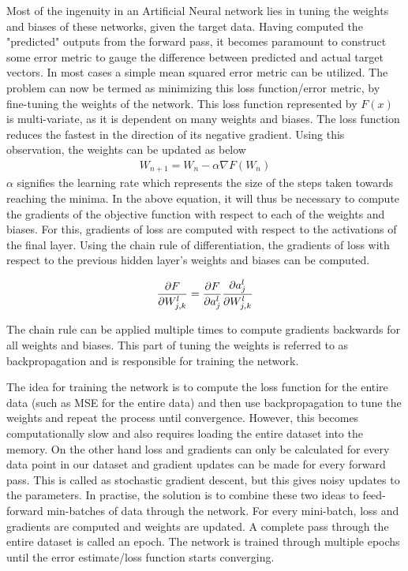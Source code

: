 \documentclass{article}
\begin{document}
Most of the ingenuity in an Artificial Neural network lies in tuning the weights and biases of these networks, given the target data. Having computed the "predicted" outputs from the forward pass, it becomes paramount to construct some error metric to gauge the difference between predicted and actual target vectors. In most cases a simple mean squared error metric can be utilized. The problem can now be termed as minimizing this loss function/error metric, by fine-tuning the weights of the network. This loss function represented by $F(x)$ is multi-variate, as it is dependent on many weights and biases. The loss function reduces the fastest in the direction of its negative gradient. Using this observation, the weights can be updated as below
\begin{equation}
    \begin{split}
        W_{n+1}=W_n-\alpha\nabla F(W_n)
    \end{split}
\end{equation}
$\alpha$ signifies the learning rate which represents the size of the steps taken towards reaching the minima. In the above equation, it will thus be necessary to compute the gradients of the objective function with respect to each of the weights and biases. For this, gradients of loss are computed with respect to the activations of the final layer. Using the chain rule of differentiation, the gradients of loss with respect to the previous hidden layer's weights and biases can be computed. 

\begin{equation}
    \frac{\partial F}{\partial W^l_{j,k}}=\frac{\partial F}{\partial a^{l}_{j}}\frac{\partial a^{l}_{j}}{\partial W^{l}_{j,k}}\\
\end{equation}

The chain rule can be applied multiple times to compute gradients backwards for all weights and biases. This part of tuning the weights is referred to as backpropagation and is responsible for training the network. 

The idea for training the network is to compute the loss function for the entire data (such as MSE for the entire data) and then use backpropagation to tune the weights and repeat the process until convergence. However, this becomes computationally slow and also requires loading the entire dataset into the memory. On the other hand loss and gradients can only be calculated for every data point in our dataset and gradient updates can be made for every forward pass. This is called as stochastic gradient descent\cite{Robbins&Monro:1951}, but this gives noisy updates to the parameters. In practise, the solution is to combine these two ideas to feed-forward min-batches of data through the network. For every mini-batch, loss and gradients are computed and weights are updated. A complete pass through the entire dataset is called an epoch. The network is trained through multiple epochs until the error estimate/loss function starts converging. 
\end{document}
